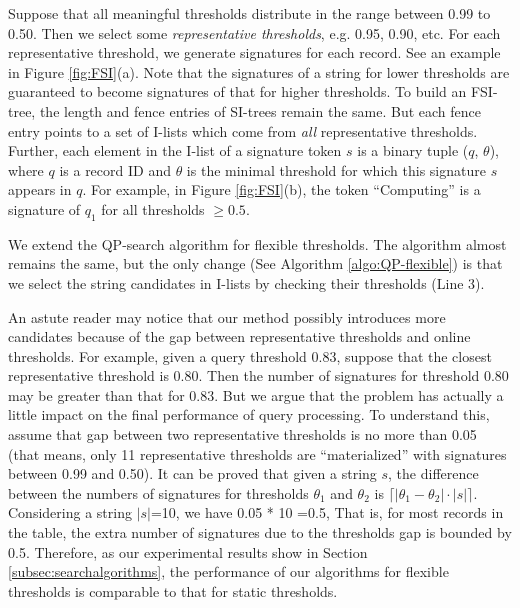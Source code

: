 Suppose that all meaningful thresholds distribute in the range between 0.99 to 0.50. Then we select some \textit{representative thresholds}, e.g. 0.95, 0.90, etc.   For each representative threshold, we generate signatures for each record. See an example in Figure \ref{fig:FSI}(a). Note that the signatures of a string for lower thresholds are guaranteed to become signatures of that for higher thresholds. To build an FSI-tree,  the length and fence entries of SI-trees remain the same. But each fence entry points to a set of I-lists which come from \textit{all} representative thresholds. Further, each element in the I-list of a signature token $s$ is a binary tuple ($q$, $\theta$), where $q$ is a record ID and $\theta$ is the minimal threshold for which this signature $s$ appears in $q$. For example, in Figure \ref{fig:FSI}(b), the token ``\textsf{Computing}''  is a signature of $q_1$ for all thresholds $\geq 0.5$.

We extend the QP-search algorithm for flexible thresholds. The algorithm almost remains the same, but  the only  change (See Algorithm \ref{algo:QP-flexible}) is that we select the string candidates in I-lists by checking their thresholds (Line 3).

An astute reader may notice that our method possibly introduces more candidates because of the gap between representative thresholds and online thresholds. For example, given a query threshold 0.83, suppose that the closest representative threshold is 0.80. Then  the number of signatures for threshold 0.80  may be greater than that for 0.83. But we argue that the problem  has actually a little impact on the final performance of query processing. To understand this, assume that gap between two representative thresholds is no more than 0.05 (that means, only 11 representative thresholds are ``materialized'' with signatures between 0.99 and 0.50). It can be proved that given a string $s$, the difference between the numbers of signatures for thresholds $\theta_1$ and $\theta_2$ is $\lceil  |\theta_1 - \theta_2|   \cdot |s| \rceil$. Considering a string $|s|$=10, we have 0.05 * 10 =0.5, That is, for most records in the table, the extra number of signatures due to the thresholds gap  is bounded by 0.5. Therefore, as our experimental results show in Section \ref{subsec:searchalgorithms}, the performance of our algorithms for flexible thresholds is comparable to that for static thresholds.



